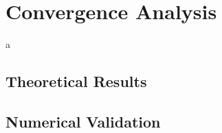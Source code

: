 \section{Convergence Analysis}
a
\subsection{Theoretical Results}
\subsection{Numerical Validation}
